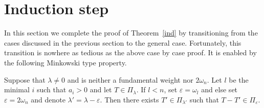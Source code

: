 \documentclass[ALCO,ThmDefs,Unicode]{cedram}
\newcommand{\la}{\lambda}
\begin{document}
\section{Induction step}

In this section we complete the proof of Theorem~\ref{ind} by transitioning from the cases discussed in the previous section to the general case. Fortunately, this transition is nowhere as tedious as the above case by case proof. It is enabled by the following Minkowski type property.

\begin{lemm}\label{mink}
Suppose that $\la\neq 0$ and is neither a fundamental weight nor $2\omega_n$. Let $l$ be the minimal $i$ such that $a_i>0$ and let $T\in\Pi_\la$. If $l<n$, set $\varepsilon=\omega_l$ and else set $\varepsilon=2\omega_n$ and denote $\lambda'=\lambda-\varepsilon$. Then there exists $T'\in\Pi_{\lambda'}$ such that $T-T'\in\Pi_\varepsilon$.
\end{lemm}
\end{document}
